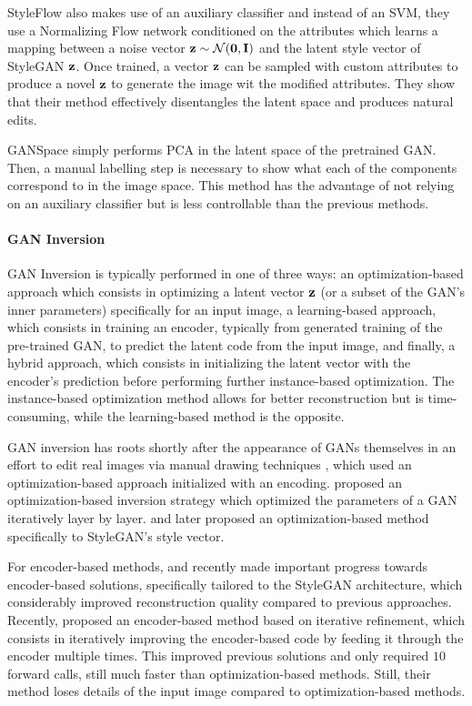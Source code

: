 StyleFlow \citep{abdal2020styleflow} 
 also makes use of an auxiliary classifier and instead of 
an SVM, they use a Normalizing Flow network conditioned on the attributes
which learns a mapping between a noise vector $\mathbf{z} \sim \mathcal{N}(\mathbf{0}, \mathbf{I})$ and the 
latent style vector of StyleGAN $\mathbf{z}$. Once trained, a vector $\mathbf{z}$ can be 
sampled with custom attributes to produce a novel $\mathbf{z}$ to generate 
the image wit the modified attributes. They show that their method 
effectively disentangles the latent space and produces natural edits.

GANSpace \citep{harkonen2020ganspace} 
 simply performs PCA in the latent space of the 
pretrained \ac{GAN}. Then, a manual labelling step is necessary to show 
what each of the components correspond to in the image space. This method 
has the advantage of not relying on an auxiliary classifier but is less 
controllable than the previous methods.



\paragraph{GAN Inversion} 

GAN Inversion is typically performed in one of three ways: an optimization-based 
approach which consists in optimizing a latent vector $\mathbf{z}$ (or a subset of the 
\ac{GAN}'s inner parameters) specifically for an input image, a learning-based 
approach, which consists in training an encoder, typically from generated training 
of the pre-trained \ac{GAN}, to predict the latent code from the input image, 
and finally, a hybrid approach, which consists in initializing the latent 
vector with the encoder's prediction before performing further instance-based 
optimization. The instance-based optimization method allows for better 
reconstruction but is time-consuming, while the learning-based method is the 
opposite.

GAN inversion has roots shortly after the appearance of \ac{GAN}s 
themselves in an effort to edit real images 
via manual drawing techniques \citep{zhu2016generative, bausemantic},
which used an optimization-based approach initialized with an encoding.
\cite{bau2019seeing} proposed an optimization-based inversion strategy 
which optimized the parameters of a \ac{GAN} iteratively layer by layer.
\cite{abdal2019image2stylegan} and later \cite{abdal2020} proposed 
an optimization-based method specifically to StyleGAN's style vector.

For encoder-based methods, \cite{zhu2020indomain, psp} and \cite {e4e}
recently made important progress towards encoder-based solutions, specifically 
tailored to the StyleGAN architecture, which considerably improved 
reconstruction quality compared to previous approaches. Recently, \cite{alaluf2021restyle}
proposed an encoder-based method based on iterative refinement, which consists 
in iteratively improving the encoder-based code by feeding it through the 
encoder multiple times. This improved previous solutions and only required 
$10$ forward calls, still much faster than optimization-based methods. Still,
their method loses details of the input image compared to optimization-based methods.

